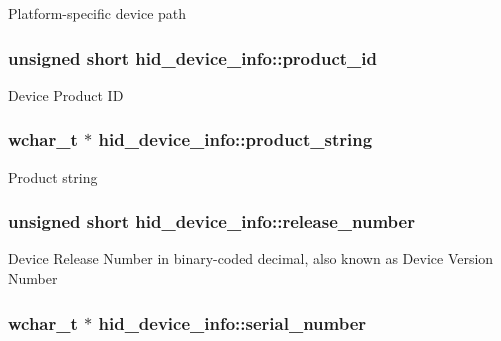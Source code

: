 Platform-\/specific device path \hypertarget{structhid__device__info_a04595915457b4374492edb1fdb62d65d}{
\subsubsection[{product\-\_\-id}]{\setlength{\rightskip}{0pt plus 5cm}unsigned short hid\-\_\-device\-\_\-info\-::product\-\_\-id}}\label{structhid__device__info_a04595915457b4374492edb1fdb62d65d}
Device Product I\-D \hypertarget{structhid__device__info_ad3aef6d60ef75a0de69bb20ba6f4729c}{
\subsubsection[{product\-\_\-string}]{\setlength{\rightskip}{0pt plus 5cm}wchar\-\_\-t $\ast$ hid\-\_\-device\-\_\-info\-::product\-\_\-string}}\label{structhid__device__info_ad3aef6d60ef75a0de69bb20ba6f4729c}
Product string \hypertarget{structhid__device__info_a6a832d25260f7ec17ef008e53e50e1d0}{
\subsubsection[{release\-\_\-number}]{\setlength{\rightskip}{0pt plus 5cm}unsigned short hid\-\_\-device\-\_\-info\-::release\-\_\-number}}\label{structhid__device__info_a6a832d25260f7ec17ef008e53e50e1d0}
Device Release Number in binary-\/coded decimal, also known as Device Version Number \hypertarget{structhid__device__info_a24473469b351e7732a4890db5bcc9473}{
\subsubsection[{serial\-\_\-number}]{\setlength{\rightskip}{0pt plus 5cm}wchar\-\_\-t $\ast$ hid\-\_\-device\-\_\-info\-::serial\-\_\-number}}\label{structhid__device__info_a24473469b351e7732a4890db5bcc9473}
